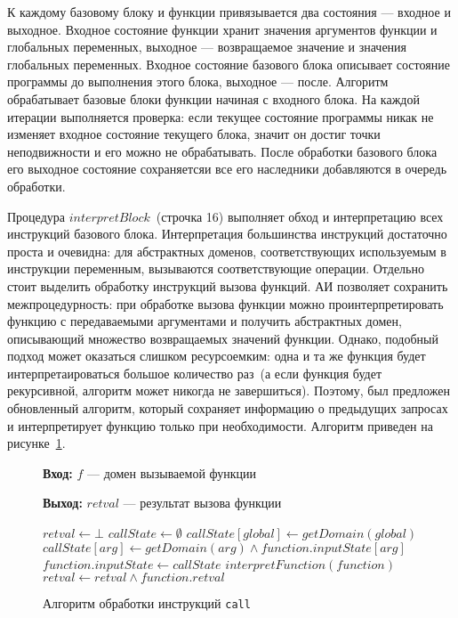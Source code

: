 К каждому базовому блоку и функции привязывается два состояния --- входное и 
выходное. Входное состояние функции хранит значения аргументов функции и 
глобальных переменных, выходное --- возвращаемое значение и значения 
глобальных переменных. Входное состояние базового блока описывает состояние 
программы до выполнения этого блока, выходное --- после. Алгоритм обрабатывает 
базовые блоки функции начиная с входного блока. На каждой итерации выполняется
проверка: если текущее состояние программы никак не изменяет входное состояние
текущего блока, значит он достиг точки неподвижности и его можно не 
обрабатывать. После обработки базового блока его выходное состояние 
сохраняетсяи все его наследники добавляются в очередь обработки.

Процедура $interpretBlock$~(строчка 16) выполняет обход и 
интерпретацию всех инструкций базового блока. Интерпретация большинства 
инструкций достаточно проста и очевидна: для абстрактных доменов, 
соответствующих используемым в инструкции переменным, вызываются 
соответствующие операции. Отдельно стоит выделить обработку инструкций вызова 
функций. АИ позволяет сохранить межпроцедурность: при обработке вызова функции
можно проинтерпретировать функцию с передаваемыми аргументами и получить 
абстрактных домен, описывающий множество возвращаемых значений функции. 
Однако, подобный подход может оказаться слишком ресурсоемким: одна и та же
функция будет интерпретаироваться большое количество раз~(а если функция будет
рекурсивной, алгоритм может никогда не завершиться). Поэтому, был предложен 
обновленный алгоритм, который сохраняет информацию о предыдущих запросах и 
интерпретирует функцию только при необходимости. Алгоритм приведен на 
рисунке~\ref{image:callArg}.

\begin{figure}[h!]
\textbf{Вход:} $f$ --- домен вызываемой функции

\textbf{Выход:} $retval$ --- результат вызова функции

\begin{algorithmic}[1]
\State $retval \gets \bot$
    \State $callState \gets \emptyset$
        \State $callState[global] \gets getDomain(global)$
    \EndFor
        \State $callState[arg] \gets getDomain(arg) \wedge
        function.inputState[arg]$
    \EndFor
        \State $function.inputState \gets callState$
        \State $interpretFunction(function)$
        \State $retval \gets retval \wedge function.retval$
    \EndIf
\EndFor
\end{algorithmic}
\caption{Алгоритм обработки инструкций \texttt{call}}
\label{image:callArg}
\end{figure}

